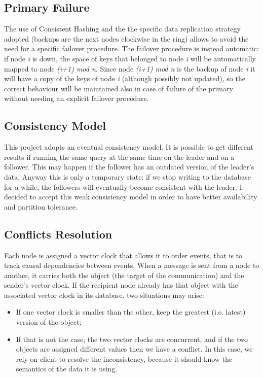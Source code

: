 \documentclass{article}
\begin{document}
\subsection{Primary Failure}
The use of Consistent Hashing and the the specific data replication strategy adopted (backups are the next nodes clockwise in the ring) allows to avoid the need for a specific failover procedure. The failover procedure is instead automatic: if node \textit{i} is down, the space of keys that belonged to node \textit{i} will be automatically mapped to node \textit{(i+1) mod n}. Since node \textit{(i+1) mod n} is the backup of node \textit{i} it will have a copy of the keys of node \textit{i} (although possibly not updated), so the correct behaviour will be maintained also in case of failure of the primary without needing an explicit failover procedure.    


\subsection{Consistency Model}
This project adopts an eventual consistency model. It is possible to get different results if running the same query at the same time on the leader and on a follower. This may happen if the follower has an outdated version of the leader's data. Anyway this is only a temporary state: if we stop writing to the database for a while, the followers will eventually become consistent with the leader. I decided to accept this weak consistency model in order to have better availability and partition tolerance.

\subsection{Conflicts Resolution}
Each node is assigned a vector clock that allows it to order events, that is to track causal dependencies between events. When a message is sent from a node to another, it carries both the object (the target of the communication) and the sender's vector clock. If the recipient node already has that object with the associated vector clock in its database, two situations may arise:
\begin{itemize}
\item \blindtext If one vector clock is smaller than the other, keep the greatest (i.e. latest) version of the object;
\item \blindtext If that is not the case, the two vector clocks are concurrent, and if the two objects are assigned different values then we have a conflict. In this case, we rely on client to resolve the inconsistency, because it should know the semantics of the data it is using.
\end{itemize}
\end{document}
